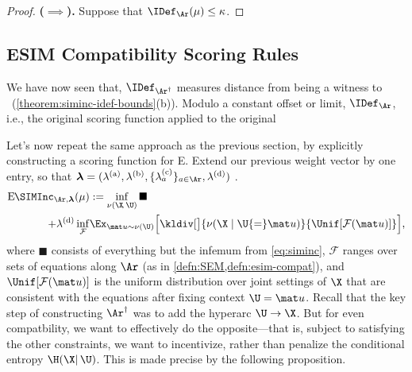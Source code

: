 \begin{subappendices}
{\begin{proof}
    \textbf{($\implies$).}
    Suppose that $\IDef_{\Ar}(\mu) \le \kappa$. 
\end{proof}


\subsection{ESIM Compatibility Scoring Rules}
We have now seen that, $\IDef_{\Ar^\dagger}$ measures distance from 
    being a witness to \scibility\ (\cref{theorem:siminc-idef-bounds}(b)).
Modulo a constant offset or limit, $\IDef_{\Ar}$, i.e., the original scoring function applied to the original \hgraph\ 

Let's now repeat the same approach as the previous section, by explicitly constructing a scoring function for E\scibility.
Extend our previous weight vector by one entry, so that $\boldsymbol\lambda = (\lambda^{\text{(a)}},\lambda^{\text{(b)}},\{\lambda^{\text{(c)}}_a\}_{a \in \Ar}, \lambda^{\text{(d)}})$
\unskip.
%
\begin{align*}
    \mathrm{E}\mskip-1mu\SIMInc_{\Ar, \boldsymbol\lambda}(\mu) 
        &:= 
        \inf_{\nu(\X\!,\,\U)} 
            \blacksquare
        \\ + \lambda^{\text{(d)}}
        \inf_{\mathcal F}& \Ex_{\mat u \sim \nu(\U)}
            \Big[ 
            \kldiv[\big]{ \nu(\X \mid \U{=}\mat u) }{ \Unif[{\mathcal F(\mat u)}] }
            \Big],
\end{align*}
where $\blacksquare$ consists of everything but the infemum from \cref{eq:siminc},
$\mathcal F$ ranges over sets of equations along $\Ar$ (as in \cref{defn:SEM,defn:esim-compat}), and $\Unif[{\mathcal F(\mat u)}]$ is the uniform distribution over joint settings of $\X$ that are consistent with the equations after fixing context $\U = \mat u$. 
Recall that the key step of constructing $\Ar^\dagger$ was to add the hyperarc $\U \to \X$. But for even compatbility, we want to effectively do the opposite---that is, subject to satisfying the other constraints, we want to incentivize, rather than penalize the conditional entropy $\H(\X|\,\U)$. This is made precise by the following proposition.


}
\end{subappendices}
